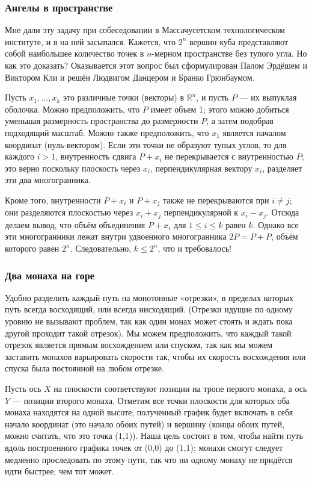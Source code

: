 \subsubsection*{Ангелы в пространстве}

Мне дали эту задачу при собеседовании в Массачусетском технологическом институте, и я на ней засыпался.
Кажется, что $2^n$ вершин куба представляют собой наибольшее количество точек в $n$-мерном пространстве без тупого угла.
Но как это доказать?
Оказывается этот вопрос был сформулирован Палом Эрдёшем и Виктором Кли и решён Людвигом Данцером и Бранко Грюнбаумом. %

Пусть $x_1,\dots,x_k$ это различные точки (векторы) в $\mathbb{R}^n$, и пусть $P$ --- их выпуклая оболочка.
Можно предположить, что $P$ имеет объем 1;
этого можно добиться уменьшая размерность пространства до размерности $P$, а затем подобрав подходящий масштаб.
Можно также предположить, что $x_1$ является началом координат (нуль-вектором).
Если эти точки не образуют тупых углов, то для каждого $i>1$, внутренность сдвига $P+x_i$ не перекрывается с внутренностью $P$;
это верно поскольку плоскость через $x_i$, перпендикулярная вектору $x_i$, разделяет эти два многогранника.

Кроме того, внутренности $P+x_i$ и $P+x_j$ также не перекрываются при $i\ne j$;
они разделяются плоскостью через $x_i+x_j$ перпендикулярной к $x_i-x_j$.
Отсюда делаем вывод, что объём объединения $P+x_i$ для $1 \le i \le k$ равен $k$.
Однако все эти многогранники лежат внутри удвоенного многогранника $2P = P+P$, объём которого равен $2^n$. Следовательно, $k \le 2^n$, что и требовалось!
\heart

\subsubsection*{Два монаха на горе}

Удобно разделить каждый путь на монотонные «отрезки», в пределах которых путь всегда восходящий, или всегда нисходящий. %
(Отрезки идущие по одному уровню не вызывают проблем, так как один монах может стоять и ждать пока другой проходит такой отрезок).
Мы можем предположить, что каждый такой отрезок является прямым восхождением или спуском, так как мы можем заставить монахов варьировать скорости так, чтобы их скорость восхождения или спуска была постоянной на любом отрезке.

Пусть ось $X$ на плоскости соответствуют позиции на тропе первого монаха, а ось $Y$ --- позиции второго монаха.
Отметим все точки плоскости для которых оба монаха находятся на одной высоте;
полученный график будет включать в себя начало координат (это начало обоих путей) и вершину (концы обоих путей, можно считать, что это точка (1,1)).
Наша цель состоит в том, чтобы найти путь вдоль построенного графика точек от (0,0) до (1,1);
монахи смогут следует медленно проследовать по этому пути, так что ни одному монаху не придётся идти быстрее, чем тот может.

